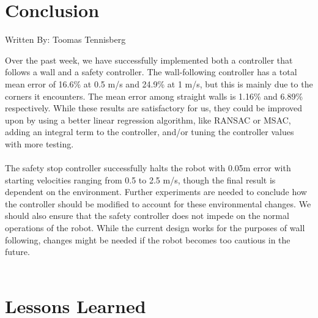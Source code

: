 \documentclass{article}
\begin{document}
\section{Conclusion}
Written By: Toomas Tennisberg\\

Over the past week, we have successfully implemented both a controller that follows a wall and a safety controller. The wall-following controller has a total mean error of 16.6\% at 0.5 {m/s} and 24.9\% at 1 {m/s}, but this is mainly due to the corners it encounters. The mean error among straight walls is 1.16\% and 6.89\% respectively. While these results are satisfactory for us, they could be improved upon by using a better linear regression algorithm, like RANSAC or MSAC, adding an integral term to the controller, and/or tuning the controller values with more testing.\\\\ 
The safety stop controller successfully halts the robot with 0.05m error with starting velocities ranging from 0.5 to 2.5 m/s, though the final result is dependent on the environment. Further experiments are needed to conclude how the controller should be modified to account for these environmental changes. We should also ensure that the safety controller does not impede on the normal operations of the robot. While the current design works for the purposes of wall following, changes might be needed if the robot becomes too cautious in the future. \\\\


\section{Lessons Learned}

\end{document}
